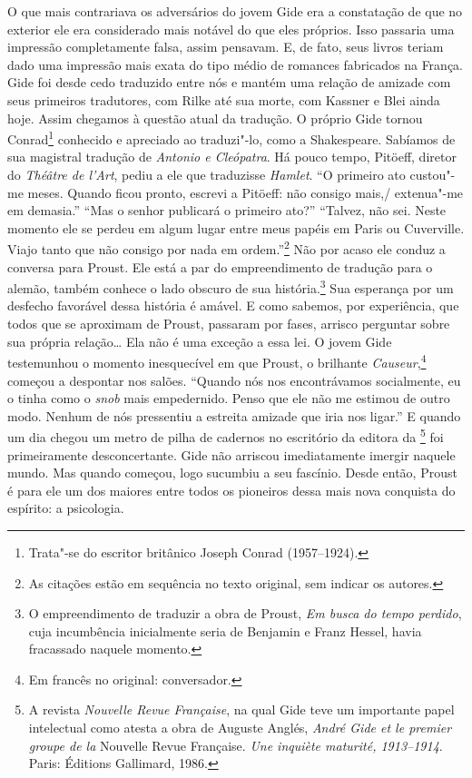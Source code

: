 O que mais contrariava os adversários do jovem Gide era a constatação de
que no exterior ele era considerado mais notável do que eles próprios.
Isso passaria uma impressão completamente falsa, assim pensavam.
E, de fato, seus livros teriam dado uma impressão mais exata do tipo médio de romances fabricados na França. Gide foi
desde cedo traduzido entre nós e mantém uma relação de amizade com seus
primeiros tradutores, com Rilke até sua morte, com Kassner e Blei ainda
hoje. Assim chegamos à questão atual da tradução. O próprio Gide
tornou Conrad\footnote{Trata"-se do escritor britânico Joseph
  Conrad (1957--1924). \versal{[N.~O.]}} conhecido e apreciado ao traduzi"-lo, como a Shakespeare. Sabíamos de sua magistral tradução de
\emph{Antonio e Cleópatra}. Há pouco tempo, Pitöeff, diretor do
\emph{Théâtre de l'Art}, pediu a ele que traduzisse \emph{Hamlet}.
``O primeiro ato custou"-me meses. Quando ficou pronto, escrevi a
Pitöeff: não consigo mais,/ extenua"-me em demasia.'' ``Mas o senhor
publicará o primeiro ato?'' ``Talvez, não sei. Neste momento ele se
perdeu em algum lugar entre meus papéis em Paris ou Cuverville. Viajo
tanto que não consigo por nada em ordem.''\footnote{As citações
  estão em sequência no texto original, sem indicar os autores. \versal{[N.~T.]}} Não por acaso ele conduz a conversa para Proust. Ele está a
par do empreendimento de tradução para o alemão, também conhece o lado
obscuro de sua história.\footnote{O empreendimento de traduzir a
  obra de Proust, \emph{Em busca do tempo perdido}, cuja incumbência
  inicialmente seria de Benjamin e Franz Hessel, havia fracassado
  naquele momento. \versal{[N.~T.]}} Sua esperança por um desfecho
favorável dessa história é amável. E como sabemos, por experiência, que todos
que se aproximam de Proust, passaram por fases, arrisco
perguntar sobre sua própria relação\ldots{} Ela não é uma exceção a essa lei.
O jovem Gide testemunhou o momento inesquecível em que Proust, o
brilhante \emph{Causeur},\footnote{Em francês no original: conversador. \versal{[N.~T.]}} começou
a despontar nos salões. ``Quando nós nos encontrávamos socialmente, eu o
tinha como o \emph{snob} mais empedernido. Penso que ele não me
estimou de outro modo. Nenhum de nós pressentiu a estreita amizade que
iria nos ligar.'' E quando um dia chegou um metro de pilha de cadernos
no escritório da editora da \footnote{A revista
  \emph{Nouvelle Revue Française}, na qual Gide teve um importante papel
  intelectual como atesta a obra de Auguste Anglés, \emph{André Gide et
  le premier groupe de la} Nouvelle Revue Française. \emph{Une inquiète
  maturité, 1913--1914}. Paris: Éditions Gallimard, 1986. \versal{[N.~T.]}} foi
primeiramente desconcertante. Gide não arriscou imediatamente imergir
naquele mundo. Mas quando começou, logo sucumbiu a seu fascínio. Desde
então, Proust é para ele um dos maiores entre todos os pioneiros dessa
mais nova conquista do espírito: a psicologia.

